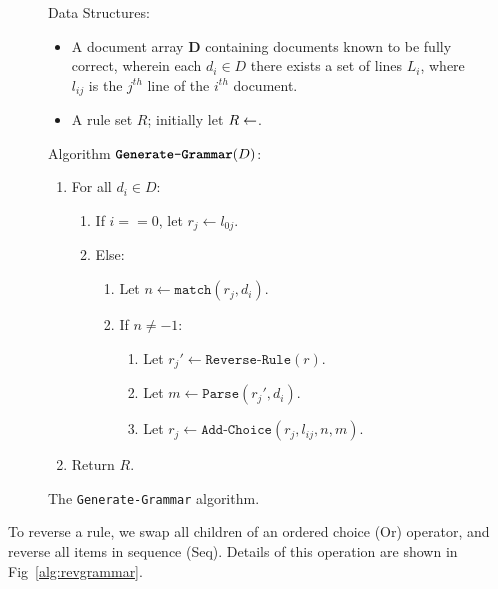 \begin{figure}[tr]
  \begin{framed}
Data Structures:
\begin{itemize}
  \item A document array $\textbf{D}$ containing documents known to be fully
  correct, wherein each $d_i \in D$ there exists a set of lines $L_i$, where
  $l_{ij}$  is the $j^{th}$ line of the $i^{th}$ document.
  \item A rule set $R$; initially let $R \leftarrow \empty$.
\end{itemize}

Algorithm $\textbf{\texttt{Generate-Grammar}}(D)$:
\begin{enumerate}
  \item For all $d_i \in D$:
  \begin{enumerate}
    \item If $i == 0$, let $r_j \leftarrow l_{0j}$.
    \item Else: 
      \begin{enumerate}
	\item Let $n \leftarrow \texttt{match}(r_j, d_i)$.
	\item If $n \neq -1$:
	  \begin{enumerate}
	    \item Let $r_j' \leftarrow \texttt{Reverse-Rule}(r)$.
	    \item Let $m    \leftarrow \texttt{Parse}(r_j', d_i)$.
	    \item Let $r_j  \leftarrow \texttt{Add-Choice}(r_j, l_{ij}, n, m)$.
	  \end{enumerate}
      \end{enumerate}
  \end{enumerate}
  \item Return $R$.
\end{enumerate}
\end{framed}
\label{alg:gengrammar}
\caption{The \texttt{Generate-Grammar} algorithm.}
\end{figure}

To reverse a rule, we swap all children of an ordered choice (Or) operator, and
reverse all items in sequence (Seq).  Details of this operation are shown in
Fig~\ref{alg:revgrammar}.


